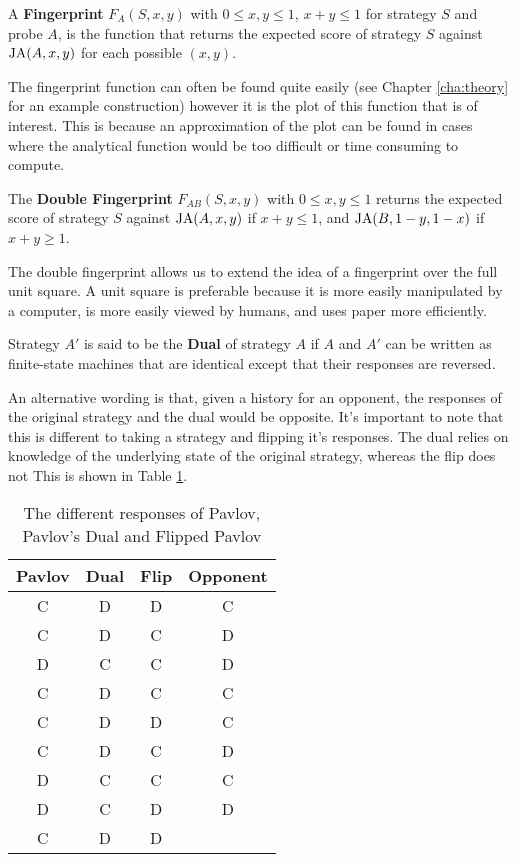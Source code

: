 \begin{definition}\label{def:fingerprint}
A \textbf{Fingerprint} $F_A(S, x, y)$ with $0 \leq x, y \leq 1$, $x+y \leq 1$ for strategy $S$ and probe $A$, is the function that returns the expected score of strategy $S$ against $\text{JA}(A, x, y)$ for each possible $(x, y)$.
\end{definition}

The fingerprint function can often be found quite easily (see Chapter \ref{cha:theory} for an example construction) however it is the plot of this function that is of interest.
This is because an approximation of the plot can be found in cases where the analytical function would be too difficult or time consuming to compute.

\begin{definition}\label{def:double-fingerprint}
The \textbf{Double Fingerprint} $F_{AB}(S, x, y)$ with $0 \leq x, y \leq 1$ returns the expected score of strategy $S$ against $\text{JA}(A, x, y)$ if $x+y \leq 1$, and $\text{JA}(B, 1-y, 1-x)$ if $x+y \geq 1$.
\end{definition}

The double fingerprint allows us to extend the idea of a fingerprint over the full unit square.
A unit square is preferable because it is more easily manipulated by a computer, is more easily viewed by humans, and uses paper more efficiently. %

\begin{definition}\label{def:dual}
Strategy $A'$ is said to be the \textbf{Dual} of strategy $A$ if $A$ and $A'$ can be written as finite-state machines that are identical except that their responses are reversed.
\end{definition}

An alternative wording is that, given a history for an opponent, the responses of the original strategy and the dual would be opposite.
It's important to note that this is different to taking a strategy and flipping it's responses.
The dual relies on knowledge of the underlying state of the original strategy, whereas the flip does not
This is shown in Table \ref{tab:strat-dual-flip}.

\begin{table}[htbp]
\centering
\begin{tabular}{c c  c | c}
Pavlov & Dual & Flip & Opponent \\
\hline
C & D & D & C\\
C & D & C & D\\
D & C & C & D\\
C & D & C & C\\
C & D & D & C\\
C & D & C & D\\
D & C & C & C\\
D & C & D & D\\
C & D & D &
\end{tabular}
\caption{The different responses of Pavlov, Pavlov's Dual and Flipped Pavlov}
\label{tab:strat-dual-flip}
\end{table}

